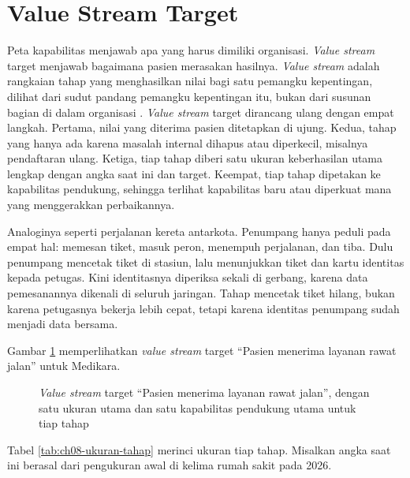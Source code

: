 \section{Value Stream Target}

Peta kapabilitas menjawab apa yang harus dimiliki organisasi. \textit{Value stream} target
menjawab bagaimana pasien merasakan hasilnya. \textit{Value stream} adalah rangkaian tahap
yang menghasilkan nilai bagi satu pemangku kepentingan, dilihat dari sudut pandang pemangku
kepentingan itu, bukan dari susunan bagian di dalam organisasi \cite{c08-togaf-g178}.
\textit{Value stream} target dirancang ulang dengan empat langkah. Pertama, nilai yang
diterima pasien ditetapkan di ujung. Kedua, tahap yang hanya ada karena masalah internal
dihapus atau diperkecil, misalnya pendaftaran ulang. Ketiga, tiap tahap diberi satu ukuran
keberhasilan utama lengkap dengan angka saat ini dan target. Keempat, tiap tahap dipetakan
ke kapabilitas pendukung, sehingga terlihat kapabilitas baru atau diperkuat mana yang
menggerakkan perbaikannya.

Analoginya seperti perjalanan kereta antarkota. Penumpang hanya peduli pada empat hal:
memesan tiket, masuk peron, menempuh perjalanan, dan tiba. Dulu penumpang mencetak tiket di
stasiun, lalu menunjukkan tiket dan kartu identitas kepada petugas. Kini identitasnya
diperiksa sekali di gerbang, karena data pemesanannya dikenali di seluruh jaringan. Tahap
mencetak tiket hilang, bukan karena petugasnya bekerja lebih cepat, tetapi karena
identitas penumpang sudah menjadi data bersama.

Gambar \ref{fig:ch08-value-stream-target} memperlihatkan \textit{value stream} target
``Pasien menerima layanan rawat jalan'' untuk Medikara.

\begin{figure}[!htb]
  \centering
  
  \caption{\textit{Value stream} target ``Pasien menerima layanan rawat jalan'', dengan satu
           ukuran utama dan satu kapabilitas pendukung utama untuk tiap tahap}
  \label{fig:ch08-value-stream-target}
\end{figure}

Tabel \ref{tab:ch08-ukuran-tahap} merinci ukuran tiap tahap. Misalkan angka saat ini
berasal dari pengukuran awal di kelima rumah sakit pada 2026.

